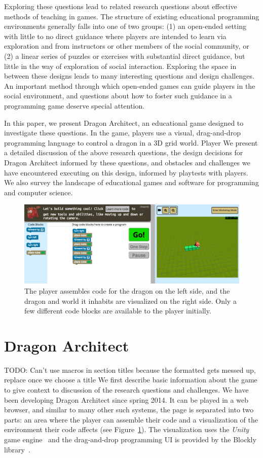 \documentclass{sig-alternate}
\newcommand{\TODO}[1]{{\color{red} TODO: #1}}
\newcommand{\gametitle}{{Dragon Architect}}
\begin{document}
Exploring these questions lead to related research questions about effective methods of teaching in games. The structure of existing educational programming environments generally falls into one of two groups: (1) an open-ended setting with little to no direct guidance where players are intended to learn via exploration and from instructors or other members of the social community, or (2) a linear series of puzzles or exercises with substantial direct guidance, but little in the way of exploration of social interaction. Exploring the space in between these designs leads to many interesting questions and design challenges. An important method through which open-ended games can guide players in the social environment, and questions about how to foster such guidance in a programming game deserve special attention.

In this paper, we present \gametitle{}, an educational game designed to investigate these questions. In the game, players use a visual, drag-and-drop programming language to control a dragon in a 3D grid world. Player We present a detailed discussion of the above research questions, the design decisions for \gametitle{} informed by these questions, and obstacles and challenges we have encountered executing on this design, informed by playtests with players. We also survey the landscape of educational games and software for programming and computer science.

\begin{figure}[t!]
  \centering
  \includegraphics[width=\textwidth]{images/overall-example}
  \caption{The player assembles code for the dragon on the left side, and the dragon and world it inhabits are visualized on the right side. Only a few different code blocks are available to the player initially.}
  \label{fig:overall}
\end{figure}

\section{\gametitle{}}
\TODO{Can't use macros in section titles because the formatted gets messed up, replace once we choose a title} 
We first describe basic information about the game to give context to discussion of the research questions and challenges.
We have been developing \gametitle{} since spring 2014. 
It can be played in a web browser, and similar to many other such systems, the page is separated into two parts: an area where the player can assemble their code and a visualization of the environment their code affects (see Figure~\ref{fig:overall}). 
The visualization uses the \emph{Unity} game engine~\cite{unity} and the drag-and-drop programming UI is provided by the Blockly library~\cite{blockly}.
\end{document}
